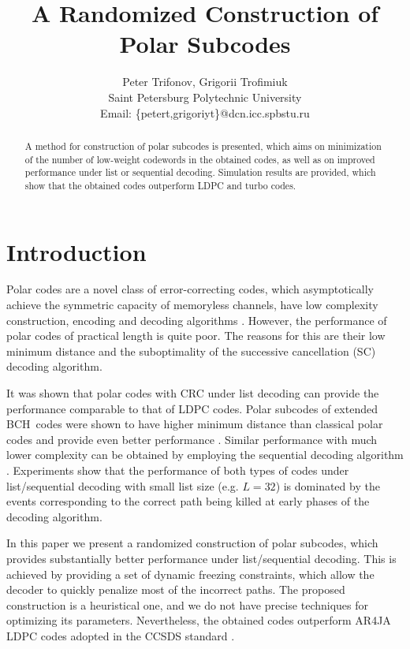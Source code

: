 \documentclass[conference]{IEEEtran}
\theoremstyle{plain}
\begin{document}
\title{A Randomized Construction of Polar Subcodes}
\author{
Peter Trifonov, Grigorii Trofimiuk\\
Saint Petersburg Polytechnic University\\
Email: \{petert,grigoriyt\}@dcn.icc.spbstu.ru}


\maketitle

\begin{abstract}
A method for construction of polar subcodes is presented, which aims on minimization  of the number of low-weight codewords in the obtained codes, as well as on improved performance under list or sequential decoding. Simulation results are provided, which show that the obtained codes outperform LDPC and turbo codes.
\end{abstract}


\section{Introduction}
Polar codes are a novel class of error-correcting codes, which asymptotically achieve the symmetric capacity of memoryless channels, have low complexity construction, encoding and decoding algorithms \cite{arikan2009channel}. However, the performance of polar codes of practical length is quite poor. The reasons for this are their low minimum distance and the suboptimality of the successive cancellation (SC) decoding algorithm. 

It was shown that polar codes with CRC under list decoding \cite{tal2015list} can provide the performance comparable to that of LDPC codes. Polar subcodes of extended BCH\ codes were shown to have higher minimum distance than classical polar codes and provide even better performance \cite{trifonov2016polar}.  Similar performance with much lower complexity can be obtained by employing the sequential decoding algorithm \cite{miloslavskaya2014sequential}. Experiments show that the performance of both types of codes under list/sequential decoding with small list size (e.g. $L=32$) is dominated by the events corresponding to the correct path being killed at early phases of the decoding algorithm.  

In this paper we present a randomized construction of polar subcodes, which provides substantially better performance under list/sequential decoding.  This is achieved by providing a set of dynamic freezing constraints, which allow the decoder to quickly penalize most of the incorrect paths.
The proposed construction is a heuristical one, and we do not have precise techniques for optimizing its parameters.  Nevertheless, the obtained codes outperform AR4JA LDPC codes adopted in the CCSDS standard  \cite{ccsds2011synccoding}.
\end{document}
